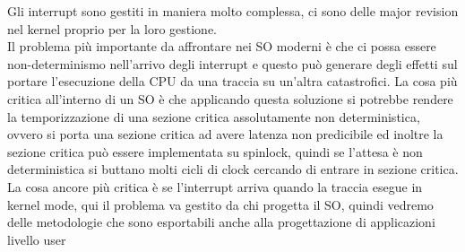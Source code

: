 \documentclass[12pt, oneside]{extbook}
\begin{document}
Gli interrupt sono gestiti in maniera molto complessa, ci sono delle major revision nel kernel proprio per la loro gestione.\\Il problema più importante da affrontare nei SO moderni è che ci possa essere non-determinismo nell'arrivo degli interrupt e questo può generare degli effetti sul portare l'esecuzione della CPU da una traccia su un'altra catastrofici. La cosa più critica all'interno di un SO è che applicando questa soluzione si potrebbe rendere la temporizzazione di una sezione critica assolutamente non deterministica, ovvero si porta una sezione critica ad avere latenza non predicibile ed inoltre la sezione critica può essere implementata su spinlock, quindi se l'attesa è non deterministica si buttano molti cicli di clock cercando di entrare in sezione critica.\\La cosa ancore più critica è se l'interrupt arriva quando la traccia esegue in kernel mode, qui il problema va gestito da chi progetta il SO, quindi vedremo delle metodologie che sono esportabili anche alla progettazione di applicazioni livello user
\end{document}
